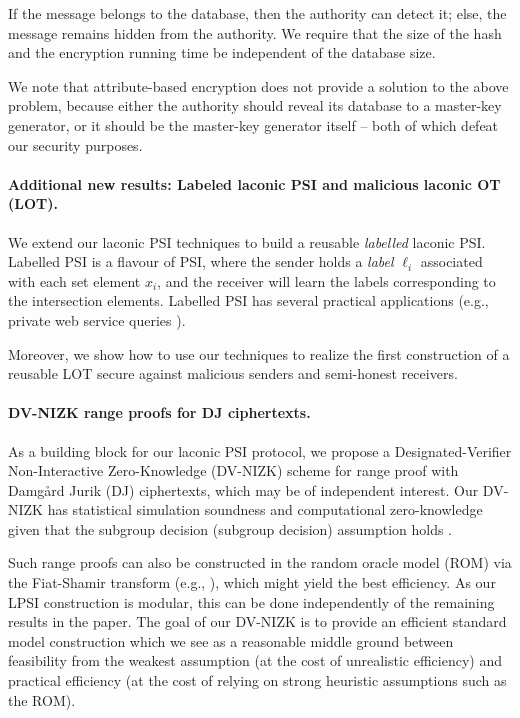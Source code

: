 If the message belongs to the database, then the authority can detect it; else, the message remains hidden from the authority. We require that the size of the hash and the encryption running time be independent of the database size.

We note that attribute-based encryption does not provide a solution to the above problem, because either the authority should reveal its database to a master-key generator, or it should be the master-key generator itself -- both of which defeat our security purposes.

 
\paragraph{Additional new results: Labeled laconic PSI and malicious laconic OT (LOT).} We extend  our laconic PSI techniques to build a reusable \emph{labelled} laconic PSI. Labelled PSI \cite{SCN:JarLiu10,CCS:CHLR18} is a flavour of  PSI, where the sender holds a \emph{label} $\ell_i$ associated with each set element $x_i$, and the receiver will learn the labels corresponding to the intersection elements.
Labelled PSI has several practical applications (e.g., private web service queries \cite{CCS:CHLR18}).
 
 Moreover,  we show how to use our techniques to realize the first construction of a reusable LOT secure against malicious senders and semi-honest receivers.

\paragraph{DV-NIZK range proofs for DJ ciphertexts.}

As a building block for our laconic PSI protocol, we propose a Designated-Verifier Non-Interactive Zero-Knowledge (DV-NIZK\footnotemark) scheme for range proof with Damg{\aa}rd Jurik (DJ) ciphertexts, which may be of independent interest. 
Our DV-NIZK has statistical simulation soundness and computational zero-knowledge given that the subgroup decision (subgroup decision) assumption holds \cite{TCC:BonGohNis05,EC:GroOstSah06}.
 

Such range proofs can also be constructed in the random oracle model (ROM) via the Fiat-Shamir transform (e.g., \cite{PKC:DamJur01,C:BBCdGL18,SP:BBBPWM18,CCS:TBMDKS20}), which might yield the best efficiency. 
 As our LPSI construction is modular, this can be done independently of the remaining results in the paper. The goal of our DV-NIZK is to provide an efficient standard model construction which we see as a reasonable middle ground between feasibility from the weakest assumption (at the cost of unrealistic efficiency) and practical efficiency (at the cost of relying on strong heuristic assumptions such as the ROM). 



